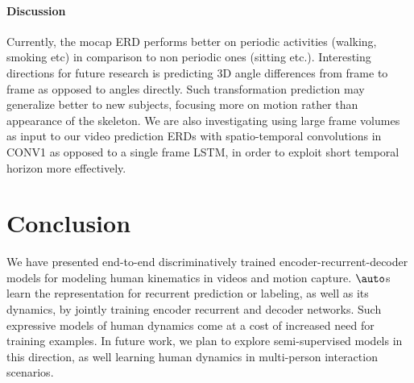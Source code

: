 \documentclass[10pt,twocolumn,letterpaper]{article}
\begin{document}
\paragraph{Discussion}
Currently, the mocap ERD performs  better on periodic activities (walking, smoking etc) in comparison to non periodic ones (sitting etc.).  Interesting directions for future research is predicting 3D angle differences from frame to frame as opposed to angles directly. Such transformation prediction may generalize better to new subjects, focusing more on  motion rather than  appearance of the skeleton. We are also investigating using large frame volumes as input to our video prediction ERDs with spatio-temporal convolutions in CONV1 as opposed to a single frame LSTM, in order to exploit short temporal horizon more effectively. 
    \section{Conclusion}%
We have presented end-to-end  discriminatively trained encoder-recurrent-decoder models for modeling human kinematics in videos and motion capture. $\auto$s   learn the representation for recurrent prediction or labeling, as well as its dynamics, by jointly training encoder recurrent and decoder networks. 
Such expressive models of human dynamics come at a cost of increased need for training examples. In future work, we plan to explore semi-supervised models in this direction, as well learning human dynamics   in multi-person interaction scenarios.   
\end{document}
